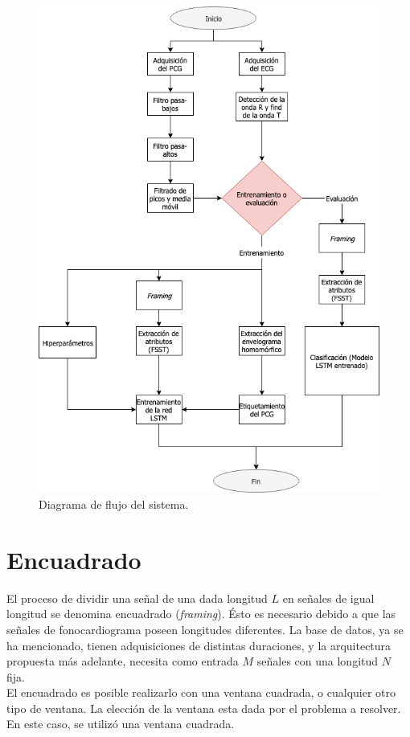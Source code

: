 \begin{figure}[H]
  \centering
  \includegraphics[scale=0.7]{sections/chapter-07/images/flow-diagram.png}
  \caption[Diagrama de flujo del sistema]{Diagrama de flujo del sistema.}
  \label{fig:flow-diagram}
\end{figure}

\newpage

\section{Encuadrado} \label{sec:framing}

\indent El proceso de dividir una señal de una dada longitud $L$ en señales de igual longitud se denomina encuadrado
(\textit{framing}). Ésto es necesario debido a que las señales de fonocardiograma poseen longitudes diferentes. La
base de datos, ya se ha mencionado, tienen adquisiciones de distintas duraciones, y la arquitectura propuesta más
adelante, necesita como entrada $M$ señales con una longitud $N$ fija. \\
\indent El encuadrado es posible realizarlo con una ventana cuadrada, o cualquier otro tipo de ventana. La elección
de la ventana esta dada por el problema a resolver. En este caso, se utilizó una ventana cuadrada. \bigskip

